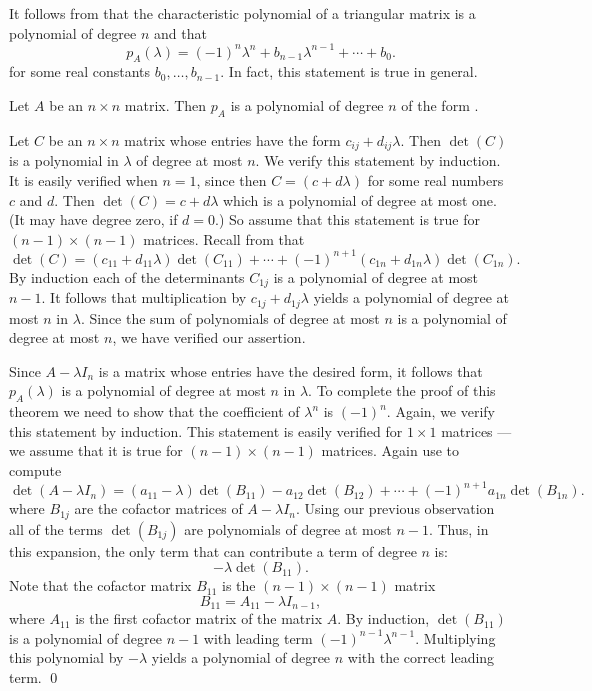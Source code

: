\documentclass{ximera}
\begin{document}
It follows from  that the characteristic
polynomial of a triangular matrix
is a polynomial of degree $n$ and that
\begin{equation}  \label{e:leadingterm}
p_A(\lambda) = (-1)^n \lambda^n + b_{n-1}\lambda^{n-1} + \cdots +b_0.
\end{equation}
for some real constants $b_0, \ldots, b_{n-1}$. In fact, this
statement is true in general.  

\begin{thm}  \label{T:charpolyn}
Let $A$ be an $n\times n$ matrix.  Then $p_A$ is a polynomial of
degree $n$ of the form .
\end{thm} 

\proof Let $C$ be an $n\times n$ matrix whose entries have
the form $c_{ij}+d_{ij}\lambda$.  Then $\det(C)$ is a polynomial
in $\lambda$ of degree at most $n$.  We verify this statement by
induction. It is easily verified when $n=1$, since then
$C=(c+d\lambda)$ for some real numbers $c$ and $d$. Then
$\det(C)=c+d\lambda$ which is a polynomial of degree at most
one.  (It may have degree zero, if $d=0$.) So assume that this
statement is true for $(n-1)\times (n-1)$ matrices. Recall from
 that 
\[
\det(C) = (c_{11}+d_{11}\lambda)\det(C_{11})
+\cdots+(-1)^{n+1}(c_{1n}+d_{1n}\lambda)\det(C_{1n}).
\]    
By induction each of the determinants $C_{1j}$ is a polynomial
of degree at most $n-1$.  It follows that multiplication by
$c_{1j}+d_{1j}\lambda$ yields a polynomial of degree at most $n$
in $\lambda$.  Since the sum of polynomials of degree at most
$n$ is a polynomial of degree at most $n$, we have verified our
assertion.

Since $A-\lambda I_n$ is a matrix whose entries have the
desired form, it follows that $p_A(\lambda)$ is a polynomial of
degree at most $n$ in $\lambda$.  To complete the proof of this
theorem we need to show that the coefficient of $\lambda^n$ is
$(-1)^n$.  Again, we verify this statement by induction.  This
statement is easily verified for $1\times 1$ matrices --- we
assume that it is true for $(n-1)\times (n-1)$ matrices.  Again
use  to compute
\[
\det(A-\lambda I_n) = (a_{11}-\lambda)\det(B_{11})-a_{12}\det(B_{12}) 
+\cdots+(-1)^{n+1}a_{1n}\det(B_{1n}).
\]
where $B_{1j}$ are the cofactor  matrices of
$A-\lambda I_n$.  Using our previous observation all of the
terms $\det(B_{1j})$ are polynomials of degree at most $n-1$.
Thus, in this expansion, the only term that can contribute a
term of degree $n$ is:
\[
-\lambda\det(B_{11}).
\]
Note that the cofactor matrix $B_{11}$ is the $(n-1)\times
(n-1)$ matrix
\[
B_{11} = A_{11} -\lambda I_{n-1},
\]
where $A_{11}$ is the first cofactor matrix of the matrix $A$.
By induction, $\det(B_{11})$ is a polynomial of degree $n-1$ with
leading term $(-1)^{n-1}\lambda^{n-1}$.  Multiplying this
polynomial by $-\lambda$ yields a polynomial of degree $n$ with
the correct leading term.  \qed
\end{document}
